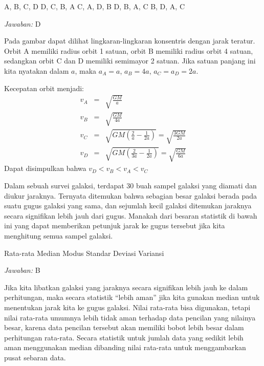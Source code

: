 \documentclass[11pt,fleqn]{exam}
\begin{document}
\begin{questions}
\begin{choices}
\choice A, B, C, D
\choice D, C, B, A
\choice C, A, D, B
\choice D, B, A, C
\choice B, D, A, C
\end{choices}

\bigskip
\textit{Jawaban: } D

Pada gambar dapat dilihat lingkaran-lingkaran konsentris dengan jarak teratur. Orbit A memiliki radius orbit 1 satuan, orbit B memiliki radius orbit 4 satuan, sedangkan orbit C dan D memiliki semimayor 2 satuan. Jika satuan panjang ini kita nyatakan dalam $a$, maka $a_A = a$, $a_B = 4a$, $a_C = a_D = 2a$.

Kecepatan orbit menjadi:
\begin{eqnarray*}
    v_A &=& \sqrt{\frac{GM}{a}}\\
    v_B &=& \sqrt{\frac{GM}{4a}}\\
    v_C &=& \sqrt{GM \left( \frac{2}{a} - \frac{1}{2a} \right)} = \sqrt{\frac{3GM}{2a}} \\
    v_D &=& \sqrt{GM \left( \frac{2}{3a} - \frac{1}{2a} \right)} = \sqrt{\frac{GM}{6a}}
\end{eqnarray*}
Dapat disimpulkan bahwa $v_D < v_B < v_A < v_C$


\vspace{0.5cm}
\question Dalam sebuah survei galaksi, terdapat 30 buah sampel galaksi yang diamati dan diukur jaraknya. Ternyata ditemukan bahwa sebagian besar galaksi berada pada suatu gugus galaksi  yang sama, dan sejumlah kecil galaksi ditemukan jaraknya secara signifikan lebih jauh dari gugus. Manakah dari besaran statistik di bawah ini yang dapat memberikan petunjuk jarak ke gugus tersebut jika kita menghitung semua sampel galaksi. 
\begin{choices}
\choice Rata-rata
\choice Median
\choice Modus
\choice Standar Deviasi
\choice Variansi
\end{choices}

\bigskip
\textit{Jawaban: } B

Jika kita libatkan galaksi yang jaraknya secara signifikan lebih jauh ke dalam perhitungan, maka secara statistik ``lebih aman'' jika kita gunakan median untuk menentukan jarak kita ke gugus galaksi. Nilai rata-rata bisa digunakan, tetapi nilai rata-rata umumnya lebih tidak aman terhadap data pencilan yang nilainya besar, karena data pencilan tersebut akan memiliki bobot lebih besar dalam perhitungan rata-rata. Secara statistik untuk jumlah data yang sedikit lebih aman menggunakan median dibanding nilai rata-rata untuk menggambarkan pusat sebaran data. 


\end{questions}
\end{document}

